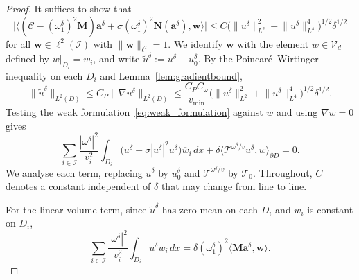 \documentclass[10pt,a4paper]{amsart}
\renewcommand{\tilde}{\widetilde}
\begin{document}
\begin{proof}
    It suffices to show that
    \begin{equation}\label{eq:approx_dual}
        \bigl\lvert \bigl\langle
          (\mathcal{C} - (\omega_1^\delta)^2 \mathbf{M}) \mathbf{a}^\delta
          + \sigma (\omega_1^\delta)^2 \mathbf{N}(\mathbf{a}^\delta),
          \mathbf{w}
        \bigr\rangle \bigr\rvert
        \leq C
        \bigl( \lVert u^\delta \rVert_{L^2}^2
          + \lVert u^\delta \rVert_{L^4}^4 \bigr)^{1/2}
        \delta^{1/2}
    \end{equation}
    for all $\mathbf{w} \in \ell^2(\mathcal{I})$ with
    $\lVert \mathbf{w} \rVert_{\ell^2} = 1$. We identify $\mathbf{w}$
    with the element $w \in \mathcal{V}_d$ defined by $w|_{D_i} = w_i$,
    and write $\tilde{u}^\delta := u^\delta - u_0^\delta$. By the
    Poincar\'e--Wirtinger inequality on each $D_i$ and
    Lemma~\ref{lem:gradientbound},
    \begin{equation}\label{eq:tilde_bound}
        \lVert \tilde{u}^\delta \rVert_{L^2(D)}
        \leq C_P \lVert \nabla u^\delta \rVert_{L^2(D)}
        \leq \frac{C_P C_\omega}{v_{\min}}
        \bigl( \lVert u^\delta \rVert_{L^2}^2
          + \lVert u^\delta \rVert_{L^4}^4 \bigr)^{1/2}
        \delta^{1/2}.
    \end{equation}
    Testing the weak formulation~\eqref{eq:weak_formulation} against $w$
    and using $\nabla w = 0$ gives
    \begin{equation}\label{eq:tested_weak}
        \sum_{i \in \mathcal{I}} \frac{|\omega^\delta|^2}{v_i^2}
        \int_{D_i}
        \bigl( u^\delta + \sigma |u^\delta|^2 u^\delta \bigr)
        \overline{w}_i \, dx
        + \delta \langle \mathcal{T}^{\omega^\delta/v} u^\delta,
          w \rangle_{\partial D} = 0.
    \end{equation}
    We analyse each term, replacing $u^\delta$ by $u_0^\delta$ and
    $\mathcal{T}^{\omega^\delta/v}$ by $\mathcal{T}_0$. Throughout, $C$
    denotes a constant independent of $\delta$ that may change from
    line to line.

    For the linear volume term, since $\tilde{u}^\delta$ has zero mean
    on each $D_i$ and $w_i$ is constant on $D_i$,
    \begin{equation}
        \sum_{i \in \mathcal{I}} \frac{|\omega^\delta|^2}{v_i^2}
        \int_{D_i} u^\delta \overline{w}_i \, dx
        = \delta(\omega_1^\delta)^2
          \langle \mathbf{M} \mathbf{a}^\delta, \mathbf{w} \rangle.
    \end{equation}


\end{proof}
\end{document}

